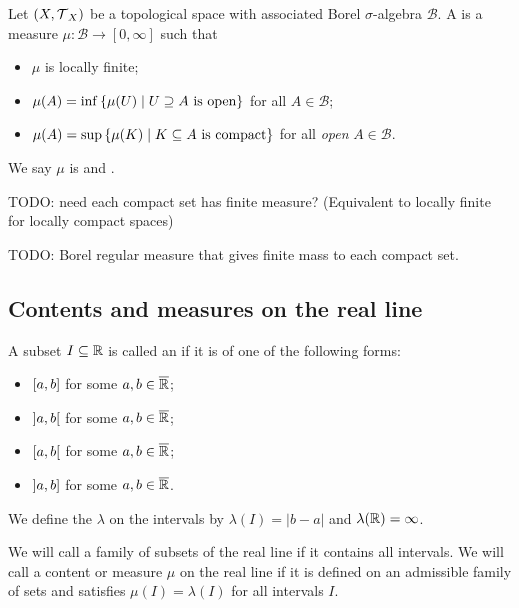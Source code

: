 \begin{definition}
Let $\sSet{X, \topology_X}$ be a topological space with associated Borel $\sigma$-algebra $\mathcal{B}$. A  is a measure $\mu: \mathcal{B}\to [0,\infty]$ such that
\begin{itemize}
\item $\mu$ is locally finite;
\item $\mu(A) = \inf\setbuilder{\mu(U)}{\text{$U\supseteq A$ is open}}$ for all $A\in \mathcal{B}$;
\item $\mu(A) = \sup\setbuilder{\mu(K)}{\text{$K\subseteq A$ is compact}}$ for all \emph{open} $A\in \mathcal{B}$.
\end{itemize}
We say $\mu$ is  and .
\end{definition}

TODO: need each compact set has finite measure? (Equivalent to locally finite for locally compact spaces)

TODO: Borel regular measure that gives finite mass to each compact set.


\subsection{Contents and measures on the real line}
\begin{definition}
A subset $I\subseteq \mathbb{R}$ is called an  if it is of one of the following forms:
\begin{itemize}
\item $\interval[c]{a,b}$ for some $a,b\in \overline{\mathbb{R}}$;
\item $\interval[o]{a,b}$ for some $a,b\in \overline{\mathbb{R}}$;
\item $\interval[co]{a,b}$ for some $a,b\in \overline{\mathbb{R}}$;
\item $\interval[oc]{a,b}$ for some $a,b\in \overline{\mathbb{R}}$.
\end{itemize}
We define the  $\lambda$ on the intervals by $\lambda(I) = |b-a|$ and $\lambda(\mathbb{R}) = \infty$.

We will call a family of subsets of the real line  if it contains all intervals. We will call a content or measure $\mu$ on the real line  if it is defined on an admissible family of sets and satisfies $\mu(I) = \lambda(I)$ for all intervals $I$.
\end{definition}

